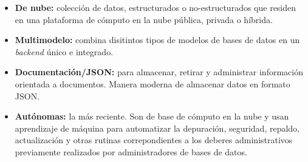 \documentclass[letterpaper, 12pt]{article}
\begin{document}
\begin{justify}
\begin{itemize}
            \item \textbf{De nube:} colección de datos, estructurados o no-estructurados que residen en una plataforma de cómputo en la nube pública, privada o híbrida.
            \item \textbf{Multimodelo:} combina disitintos tipos de modelos de bases de datos en un \emph{backend} único e integrado.
            \item \textbf{Documentación/JSON:} para almacenar, retirar y administrar información orientada a documentos. Manera moderna de almacenar datos en formato JSON.
            \item \textbf{Autónomas:} la más reciente. Son de base de cómputo en la nube y usan aprendizaje de máquina para automatizar la depuración, seguridad, repaldo, actualización y
            otras rutinas correpondientes a los deberes administrativos previamente realizados por administradores de bases de datos.
        \end{itemize}

\end{justify}
\end{document}
